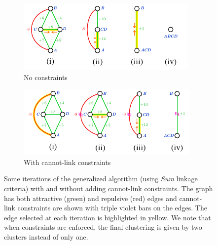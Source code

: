 \begin{figure}
\centering
        \begin{subfigure}[t]{0.42 \textwidth}
        \centering
        \includegraphics[width=\textwidth]{figs/example_no_constr.pdf}
        \caption{No constraints}\label{subfig:no_constraints}
    \end{subfigure} \hfill
    \begin{subfigure}[t]{0.42 \textwidth}
        \centering
        \includegraphics[width=\textwidth]{figs/example_with_constr.pdf}
        \caption{With cannot-link constraints}\label{subfig:with_constraints}
    \end{subfigure}
\caption{Some iterations of the generalized algorithm (using \emph{Sum} linkage criteria) with and without adding cannot-link constraints. The graph has both attractive (green) and repulsive (red) edges and cannot-link constraints are shown with triple violet bars on the edges. The edge selected at each iteration is highlighted in yellow. We note that when constraints are enforced, the final clustering is given by two clusters instead of only one.}
\label{fig:algorithm_with_without_CLC}
\end{figure}


      
